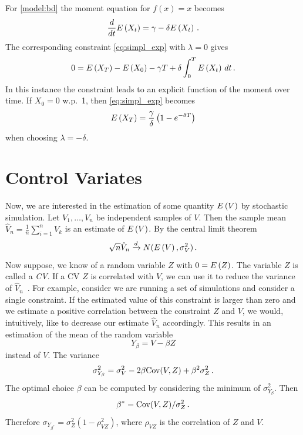 For \autoref{model:bd} the moment equation for $f(x)=x$ becomes
$$\frac{d}{dt}{E}\left(X_t\right)=\gamma - \delta{E}\left(X_t\right)\,.$$
The corresponding constraint \eqref{eq:simpl_exp} with $\lambda=0$ gives
$$0={E}\left(X_T\right) - {E}\left(X_0\right) - \gamma T + \delta \int_0^{T} {E}\left(X_t\right)\,dt\,.$$
In this instance the constraint  leads to an explicit function of
the moment over time. If  $X_0=0$ w.p.\ 1, then \eqref{eq:simpl_exp} becomes
\begin{equation}\label{eq:bd_constraint}
{E}\left(X_T\right) = \frac{\gamma}{\delta} \left(1 - e^{-\delta T}\right)
\end{equation}
when choosing $\lambda=-\delta$.

\section{Control Variates}\label{sec:cv:var_red}
Now, we are interested in the estimation of some quantity ${E}\left(V\right)$
by stochastic simulation.
Let $V_1,\dots,V_n$ be independent samples of $V$.
Then the sample mean $\hat{V}_n
=\frac{1}{n}\sum_{i=1}^n V_k$ is an estimate of ${E}\left(V\right)$.
By the central limit theorem
\[
\sqrt{n}\hat{V}_n\xrightarrow{d}N({E}\left(V\right),\sigma_V^2)\,.
\]
Now suppose, we know of a random variable $Z$ with $0={E}\left(Z\right)$.
The variable $Z$ is called a \emph{\acf{CV}}.
If a \acl{CV} $Z$ is correlated with $V$, we can
use it to
reduce the variance of $\hat{V}_n$~\cite{glasserman2005large,nelson1990control,szechtman2003control,wilson1984variance}.
For example, consider we are running a set of simulations and consider a single
constraint.
If the estimated value of this constraint is larger than zero and we estimate a positive correlation
between the constraint $Z$ and $V$, we would, intuitively, like to {decrease} our
estimate $\hat{V}_n$ accordingly.
This results in an estimation of the mean of the random variable $$Y_{\beta}= V-\beta Z$$ instead of $V$.
The variance%
$$\sigma_{Y_{\beta}}^2 = \sigma_V^2-2\beta \mathrm{Cov}(V, Z) + \beta^2\sigma_Z^2\,.$$
The optimal choice $\beta$ can be computed by  considering the minimum of $\sigma_{Y_\beta}^2$. Then
$$\beta^{*}={\mathrm{Cov}(V, Z)}/{\sigma_Z^2}\,.$$
Therefore $\sigma_{Y_{\beta^{*}}}=\sigma_Z^2(1 - \rho_{VZ}^2)$,
where $\rho_{VZ}$ is the correlation of $Z$ and $V$.

